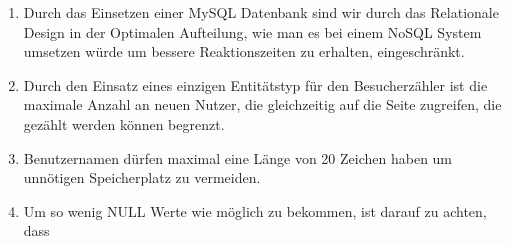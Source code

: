 \documentclass[10pt,a4paper]{scrartcl}
\begin{document}
\begin{enumerate}
 \item Durch das Einsetzen einer MySQL Datenbank sind wir durch das Relationale Design in der Optimalen Aufteilung, wie man es bei einem NoSQL System umsetzen würde um bessere Reaktionszeiten zu erhalten, eingeschränkt.
 \item Durch den Einsatz eines einzigen Entitätstyp für den Besucherzähler ist die maximale Anzahl an neuen Nutzer, die gleichzeitig auf die Seite zugreifen, die gezählt werden können begrenzt.
 \item Benutzernamen dürfen maximal eine Länge von 20 Zeichen haben um unnötigen Speicherplatz zu vermeiden.
 \item Um so wenig NULL Werte wie möglich zu bekommen, ist darauf zu achten, dass
\end{enumerate}

\end{document}
